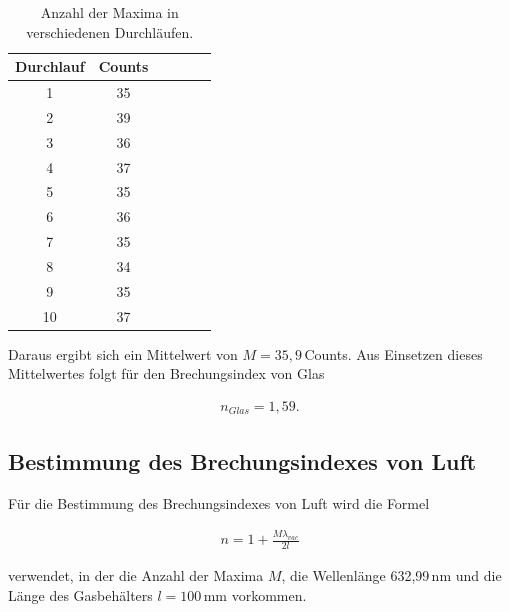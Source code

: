             \begin{table}
                \centering
                \caption{Anzahl der Maxima in verschiedenen Durchläufen.}
                \label{tab:glas}
                \begin{tabular}{c c c c c c}
                    \toprule
                    Durchlauf & Counts\\
                    \midrule
                        1   & 35 \\
                         2  & 39 \\
                          3 & 36 \\
                           4& 37 \\
                           5& 35 \\
                        6   & 36 \\
                         7  & 35 \\
                          8 & 34 \\
                           9& 35 \\
                          10& 37 \\
                    \bottomrule
                \end{tabular}
            \end{table}
            
            Daraus ergibt sich 
            ein Mittelwert von $M=35,9$\,Counts. Aus Einsetzen dieses Mittelwertes folgt für den Brechungsindex
            von Glas 

            \begin{align*}
                n_{Glas} = 1,59.
            \end{align*}


        \subsection{Bestimmung des Brechungsindexes von Luft}

            Für die Bestimmung des Brechungsindexes von Luft wird die Formel 

            \begin{align*}
                n = 1 + \frac{M\lambda_{vac}}{2l}
            \end{align*}

            verwendet, in der die Anzahl der Maxima $M$, die Wellenlänge 632,99\,nm und die 
            Länge des Gasbehälters $l = 100$\,mm vorkommen.

